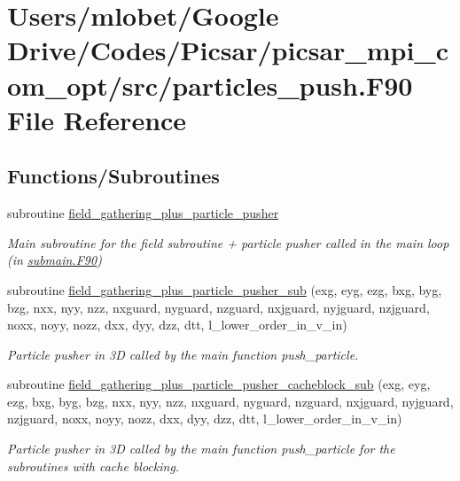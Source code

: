 \hypertarget{particles__push_8_f90}{}\section{Users/mlobet/\+Google Drive/\+Codes/\+Picsar/picsar\+\_\+mpi\+\_\+com\+\_\+opt/src/particles\+\_\+push.F90 File Reference}
\label{particles__push_8_f90}
\subsection*{Functions/\+Subroutines}
\begin{DoxyCompactItemize}
\item 
subroutine \hyperlink{particles__push_8_f90_aba6f2e1d26c95eebe4a184e026c0a3f6}{field\+\_\+gathering\+\_\+plus\+\_\+particle\+\_\+pusher}
\begin{DoxyCompactList}\small\item\em Main subroutine for the field subroutine + particle pusher called in the main loop (in \hyperlink{submain_8_f90}{submain.\+F90}) \end{DoxyCompactList}\item 
subroutine \hyperlink{particles__push_8_f90_ac0c9813b939a0ef799437c54d49cc947}{field\+\_\+gathering\+\_\+plus\+\_\+particle\+\_\+pusher\+\_\+sub} (exg, eyg, ezg, bxg, byg, bzg, nxx, nyy, nzz,           nxguard, nyguard, nzguard, nxjguard, nyjguard, nzjguard, noxx, noyy,           nozz, dxx, dyy, dzz, dtt, l\+\_\+lower\+\_\+order\+\_\+in\+\_\+v\+\_\+in)
\begin{DoxyCompactList}\small\item\em Particle pusher in 3D called by the main function push\+\_\+particle. \end{DoxyCompactList}\item 
subroutine \hyperlink{particles__push_8_f90_a59d6ed8231bfda3a4c6d828c848b18ff}{field\+\_\+gathering\+\_\+plus\+\_\+particle\+\_\+pusher\+\_\+cacheblock\+\_\+sub} (exg, eyg, ezg, bxg, byg, bzg, nxx, nyy, nzz, nxguard, nyguard, nzguard, nxjguard, nyjguard, nzjguard, noxx, noyy, nozz, dxx, dyy, dzz, dtt, l\+\_\+lower\+\_\+order\+\_\+in\+\_\+v\+\_\+in)
\begin{DoxyCompactList}\small\item\em Particle pusher in 3D called by the main function push\+\_\+particle for the subroutines with cache blocking. \end{DoxyCompactList}\item 

\end{DoxyCompactItemize}
